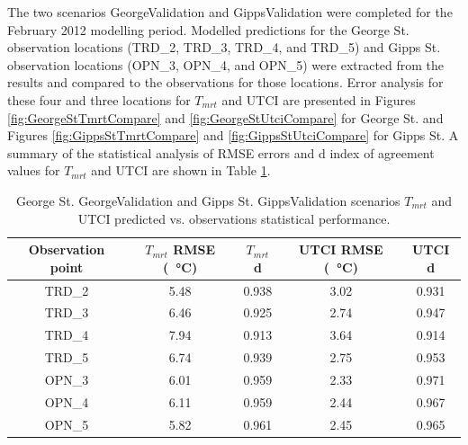 \documentclass[final,3p,times,authoryear]{elsarticle}
\begin{document}




The two scenarios GeorgeValidation and GippsValidation were completed for the February 2012 modelling period. Modelled predictions for the George St. observation locations (TRD\_2, TRD\_3, TRD\_4, and TRD\_5) and Gipps St. observation locations (OPN\_3, OPN\_4, and OPN\_5) were extracted from the results and compared to the observations for those locations. Error analysis for these four and three locations for $T_{mrt}$ and UTCI are presented in Figures \ref{fig:GeorgeStTmrtCompare} and \ref{fig:GeorgeStUtciCompare} for George St. and Figures \ref{fig:GippsStTmrtCompare} and \ref{fig:GippsStUtciCompare} for Gipps St. A summary of the statistical analysis of RMSE errors and d index of agreement values for $T_{mrt}$ and UTCI are shown in Table \ref{tab:georgetmrt}. 

\begin{center}
\begin{table}[!htbp]
\caption{George St. GeorgeValidation and Gipps St. GippsValidation scenarios $T_{mrt}$ and UTCI predicted vs. observations statistical performance.\label{tab:georgetmrt}}
  \begin{tabular}{  | c |c |c  | c | c | } 
	\hline \textbf{Observation point} & \textbf{$T_{mrt}$ RMSE (\SI{}{\degreeCelsius})} & \textbf{$T_{mrt}$ d} & \textbf{UTCI RMSE (\SI{}{\degreeCelsius})} & \textbf{UTCI d}\\ \hline
TRD\_2  &  5.48   & 0.938  & 3.02  & 0.931   \\ \hline
TRD\_3   & 6.46   & 0.925  & 2.74  & 0.947   \\ \hline
TRD\_4   & 7.94   & 0.913  & 3.64  & 0.914  \\ \hline
TRD\_5   & 6.74   & 0.939  & 2.75  & 0.953   \\ \hline
OPN\_3   & 6.01   & 0.959  & 2.33  & 0.971   \\ \hline
OPN\_4  &  6.11   & 0.959  & 2.44  & 0.967   \\ \hline
OPN\_5   & 5.82   & 0.961  & 2.45  & 0.965  \\ \hline
  \end{tabular} 
\end{table}
\end{center} 
\end{document}
